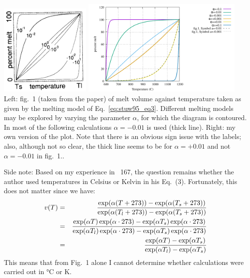 \begin{center}
\includegraphics[width=4.5cm]{python_codes/fieldstone_169/images/stuw95a}
\includegraphics[width=8cm]{python_codes/fieldstone_169/images/percent_melt_C}\\
{\captionfont Left: fig.~1 (taken from the paper) of melt volume against temperature taken as given by
the melting model of Eq.~\eqref{eq:stuw95_eq3}. Different melting models may
be explored by varying the parameter $\alpha$, for which the diagram 
is contoured. In most of the following calculations
$\alpha= - 0.01$ is used (thick line).
Right: my own version of the plot. Note that there is an obvious sign issue 
with the labels; also, although not so clear, the thick line seems to be for 
$\alpha=+0.01$ and not $\alpha=-0.01$ in fig.~1.}.
\end{center}

Side note: Based on my experience in \stone~167, the question remains whether the 
author used temperatures in Celsius or Kelvin in his Eq.~(3). Fortunately, this does not matter since
we have:
\begin{eqnarray}
v(T) 
&=& \frac{\exp(\alpha (T+273))- \exp(\alpha (T_s+273)) }{\exp(\alpha (T_l+273)) - \exp(\alpha (T_s+273)) } \nonumber\\
&=& \frac{\exp(\alpha T) \exp(\alpha\cdot 273)- \exp(\alpha T_s) \exp(\alpha\cdot 273)}
{\exp(\alpha T_l) \exp(\alpha\cdot 273)- \exp(\alpha T_s) \exp(\alpha\cdot 273)} \nonumber\\
&=& \frac{\exp(\alpha T)- \exp(\alpha T_s) }{\exp(\alpha T_l) - \exp(\alpha T_s) } \nonumber
\end{eqnarray}
This means that from Fig.~1 alone I cannot determine whether calculations were 
carried out in \si{\celsius} or \si{\kelvin}.



